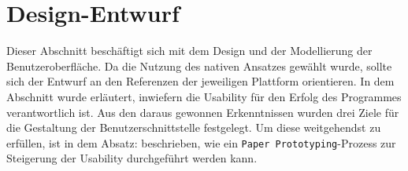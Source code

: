 \documentclass[Bachelorarbeit.tex]{subfiles}
\begin{document}
\begin{comment}
\subsubsection*{Ablauf}
Die internen Informationen des Clients werden mit den Daten der zu speichernden Veranstaltung abgeglichen und gegebenenfalls aktualisiert. Zusätzlich wird die Veranstaltung - im System - als "`noch nicht versendet"' markiert.
Anschließend werden alle Daten der ausgewählten Veranstaltung aufbereitet und der hinterlegte Identitätsnachweis wird an die Anfrage - für den Server - angehängt.\\
\\
Im ersten Schritt auf der Server-Seite wird der mitgesendete Identitätsnachweis auf seine Gültigkeit geprüft. 
Dieses Verifizierungsverfahren besteht aus folgenden zwei Teilen. 
Es wird analysiert, ob der erhaltene Identitätsnachweis, Serverseitig im System, hinterlegt ist. 
Ist dies der Fall wird - anhand des Ablaufzeitpunktes - geprüft ob der Identitätsnachweis noch gültig ist. 
Sollten diese Prüfungen negativ ausfallen, wird der Client über die Problematik informiert und gibt diese Information an die Benutzer weiter.
Der Anwendungsfall wird abgebrochen.
Ist der Prüfungsbescheid positiv fährt der Server mit der Arbeit beim nächsten Schritt fort.\\
\\
Der zweite Schritt besteht aus der Autorisierung der Benutzer. Dieser Teil wird vollständig auf der Serverseite durchgeführt.
Es wird - anhand des Identitätsnachweises - der entsprechende User ausgewählt und geprüft ob dieser über eine Berechtigung, zum dokumentieren von Veranstaltungen, verfügt. 
Sollte diese Prüfung negativ ausfallen, wird der Client über die Problematik informiert und gibt diese Information an die Benutzer weiter.
Der Anwendungsfall wird abgebrochen.\\
\\
Im dritten Schritt, aktualisiert der Server die hinterlegten Informationen der Veranstaltung und sendet eine Bestätigung an den Client.
Mit Erhalt der Bestätigung des Servers, wird die "`noch nicht versendet"'-Markierung, von der Veranstaltung entfernt.
Der Anwendungsfall ist abgeschlossen.


\newpage
\end{comment}


\section{Design-Entwurf}
\label{sec:design_entwurf}
Dieser Abschnitt beschäftigt sich mit dem Design und der Modellierung der Benutzeroberfläche.
Da die Nutzung des nativen Ansatzes gewählt wurde, sollte sich der Entwurf an den Referenzen der jeweiligen Plattform orientieren.
In dem Abschnitt  wurde erläutert, inwiefern die Usability für den Erfolg des Programmes verantwortlich ist. Aus den daraus gewonnen Erkenntnissen wurden drei Ziele für die Gestaltung der Benutzerschnittstelle festgelegt. Um diese weitgehendst zu erfüllen, ist in dem Absatz:  beschrieben, wie ein  \texttt{Paper Prototyping}-Prozess zur Steigerung der Usability durchgeführt werden kann.
\end{document}
